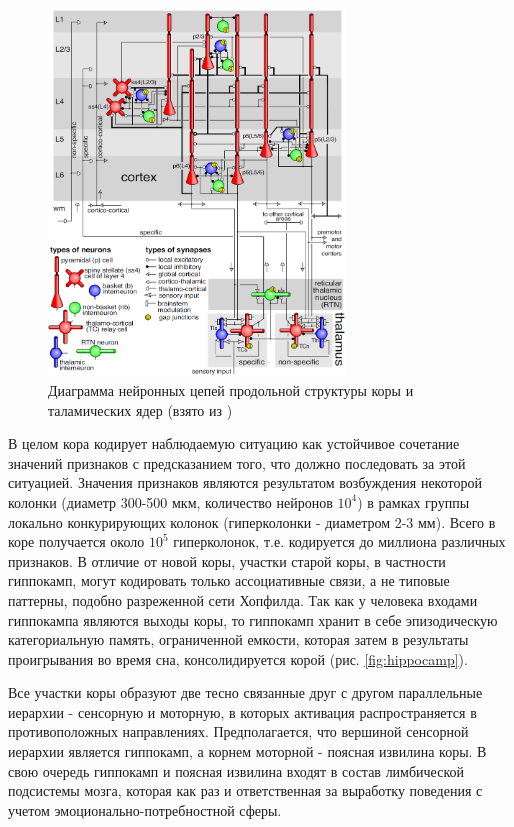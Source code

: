 \documentclass[12pt]{report}
\begin{document}
	\begin{figure}
		\centering
		\includegraphics[width=0.7\textwidth]{misc/phisio/cort-talam_loop}
		\caption{Диаграмма нейронных цепей продольной структуры коры и таламических ядер (взято из \cite{Izhikevich2008})}
		\label{fig:cotr_talam}		
	\end{figure}

	В целом кора кодирует наблюдаемую ситуацию как устойчивое сочетание значений признаков с предсказанием того, что должно последовать за этой ситуацией. Значения признаков являются результатом возбуждения некоторой колонки (диаметр 300-500 мкм, количество нейронов $10^4$) в рамках группы локально конкурирующих колонок (гиперколонки - диаметром 2-3 мм). Всего в коре получается около $10^5$ гиперколонок, т.е. кодируется до миллиона различных признаков. В отличие от новой коры, участки старой коры, в частности гиппокамп, могут кодировать только ассоциативные связи, а не типовые паттерны, подобно разреженной сети Хопфилда. Так как у человека входами гиппокампа являются выходы коры, то гиппокамп хранит в себе эпизодическую категориальную память, ограниченной емкости, которая затем в результаты проигрывания во время сна, консолидируется корой (рис. \ref{fig:hippocamp}).
	
	Все участки коры образуют две тесно связанные друг с другом параллельные иерархии - сенсорную и моторную, в которых активация распространяется в противоположных направлениях. Предполагается, что вершиной сенсорной иерархии является гиппокамп, а корнем моторной - поясная извилина коры. В свою очередь гиппокамп и поясная извилина входят в состав лимбической подсистемы мозга, которая как раз и ответственная за выработку поведения с учетом эмоционально-потребностной сферы.
\end{document}
